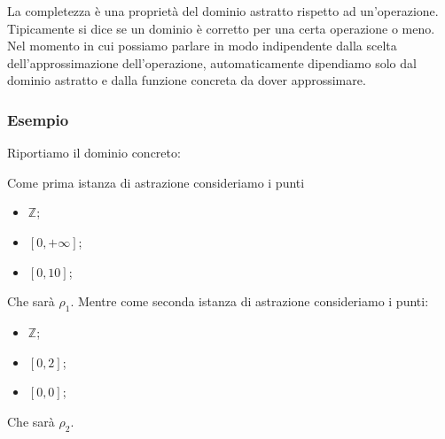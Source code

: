 La completezza è una proprietà del dominio astratto rispetto ad un'operazione. Tipicamente 
si dice se un dominio è corretto per una certa operazione o meno. Nel momento in cui 
possiamo parlare in modo indipendente dalla scelta dell'approssimazione dell'operazione,
automaticamente dipendiamo solo dal dominio astratto e dalla funzione concreta da dover approssimare.

\subsubsection{Esempio}

\begin{minipage}{0.5\textwidth}
    Riportiamo il dominio concreto:

    \begin{figure}[H]
        \centering
      \end{figure}
\end{minipage}
\begin{minipage}{0.5\textwidth}
    Come prima istanza di astrazione consideriamo i punti 
    \begin{itemize}
        \item $\mathbb{Z}$;
        \item $[0, + \infty]$;
        \item $[0, 10]$;
    \end{itemize}
    Che sarà $\rho_1$.
    Mentre come seconda istanza di astrazione consideriamo i punti:
    \begin{itemize}
        \item $\mathbb{Z}$;
        \item $[0, 2]$;
        \item $[0, 0]$;
    \end{itemize}
    Che sarà $\rho_2$.
\end{minipage}

